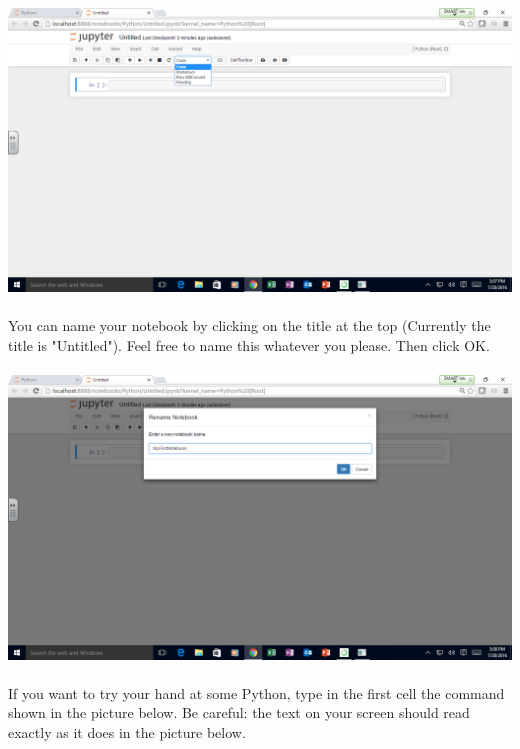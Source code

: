 \documentclass[]{article}
\begin{document}
\paragraph{}
\begin{centering}
    \centerline{\includegraphics[scale=0.35]{Screenshot_21.png}}
\end{centering}

\paragraph{}
You can name your notebook by clicking on the title at the top (Currently the title is "Untitled"). Feel free to name this whatever you please. Then click OK.
\paragraph{}
\begin{centering}
    \centerline{\includegraphics[scale=0.35]{Screenshot_22.png}}
\end{centering}

\paragraph{}
If you want to try your hand at some Python, type in the first cell the command shown in the picture below. Be careful: the text on your screen should read exactly as it does in the picture below.
\end{document}
